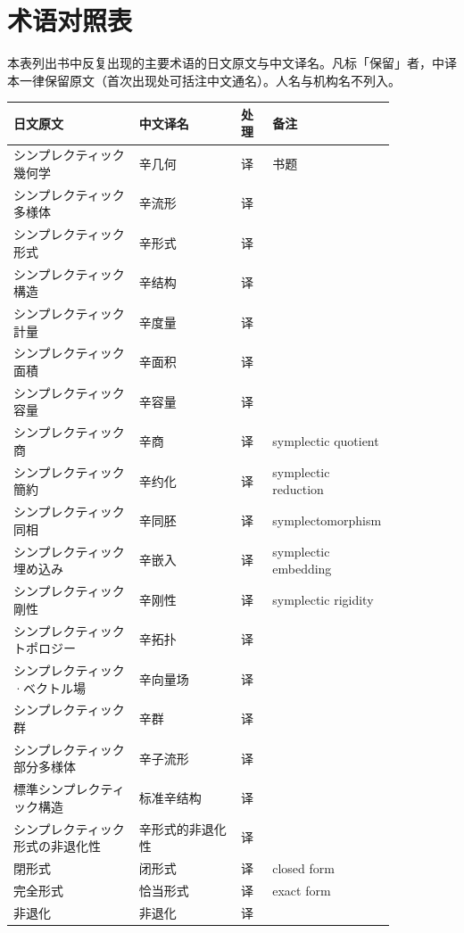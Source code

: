 \chapter{术语对照表}

本表列出书中反复出现的主要术语的日文原文与中文译名。凡标「保留」者，中译本一律保留原文（首次出现处可括注中文通名）。人名与机构名不列入。\par\medskip

{\small
\begin{longtable}{p{0.32\linewidth} p{0.26\linewidth} p{0.08\linewidth} p{0.19\linewidth}}
\toprule
日文原文 & 中文译名 & 处理 & 备注 \\
\midrule
\endhead
シンプレクティック幾何学 & 辛几何 & 译 & 书题 \\
シンプレクティック多様体 & 辛流形 & 译 &  \\
シンプレクティック形式 & 辛形式 & 译 &  \\
シンプレクティック構造 & 辛结构 & 译 &  \\
シンプレクティック計量 & 辛度量 & 译 &  \\
シンプレクティック面積 & 辛面积 & 译 &  \\
シンプレクティック容量 & 辛容量 & 译 &  \\
シンプレクティック商 & 辛商 & 译 & symplectic quotient \\
シンプレクティック簡約 & 辛约化 & 译 & symplectic reduction \\
シンプレクティック同相 & 辛同胚 & 译 & symplectomorphism \\
シンプレクティック埋め込み & 辛嵌入 & 译 & symplectic embedding \\
シンプレクティック剛性 & 辛刚性 & 译 & symplectic rigidity \\
シンプレクティックトポロジー & 辛拓扑 & 译 &  \\
シンプレクティック·ベクトル場 & 辛向量场 & 译 &  \\
シンプレクティック群 & 辛群 & 译 &  \\
シンプレクティック部分多様体 & 辛子流形 & 译 &  \\
標準シンプレクティック構造 & 标准辛结构 & 译 &  \\
シンプレクティック形式の非退化性 & 辛形式的非退化性 & 译 &  \\
閉形式 & 闭形式 & 译 & closed form \\
完全形式 & 恰当形式 & 译 & exact form \\
非退化 & 非退化 & 译 &  \\

\end{longtable}}
